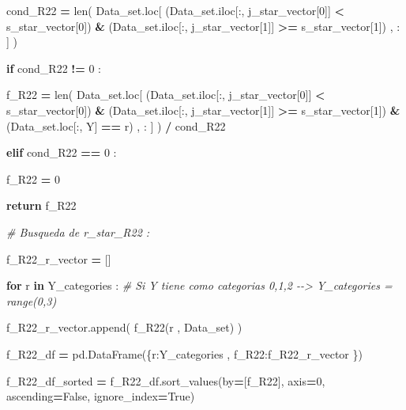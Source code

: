 \documentclass[
  11pt,
  a4paper,
]{article}
\newenvironment{Shaded}{\begin{snugshade}}{\end{snugshade}}
\newcommand{\BuiltInTok}[1]{#1}
\newcommand{\CommentTok}[1]{\textcolor[rgb]{0.56,0.35,0.01}{\textit{#1}}}
\newcommand{\ControlFlowTok}[1]{\textcolor[rgb]{0.13,0.29,0.53}{\textbf{#1}}}
\newcommand{\DecValTok}[1]{\textcolor[rgb]{0.00,0.00,0.81}{#1}}
\newcommand{\KeywordTok}[1]{\textcolor[rgb]{0.13,0.29,0.53}{\textbf{#1}}}
\newcommand{\NormalTok}[1]{#1}
\newcommand{\OperatorTok}[1]{\textcolor[rgb]{0.81,0.36,0.00}{\textbf{#1}}}
\newcommand{\StringTok}[1]{\textcolor[rgb]{0.31,0.60,0.02}{#1}}
\newcommand{\VariableTok}[1]{\textcolor[rgb]{0.00,0.00,0.00}{#1}}
\begin{document}
\begin{Shaded}
\begin{Highlighting}[]
\NormalTok{                    cond\_R22 }\OperatorTok{=} \BuiltInTok{len}\NormalTok{( Data\_set.loc[ (Data\_set.iloc[:, j\_star\_vector[}\DecValTok{0}\NormalTok{]] }\OperatorTok{\textless{}}\NormalTok{ s\_star\_vector[}\DecValTok{0}\NormalTok{]) }\OperatorTok{\&}\NormalTok{ (Data\_set.iloc[:, j\_star\_vector[}\DecValTok{1}\NormalTok{]] }\OperatorTok{\textgreater{}=}\NormalTok{ s\_star\_vector[}\DecValTok{1}\NormalTok{]) , : ] ) }

                    \ControlFlowTok{if}\NormalTok{  cond\_R22 }\OperatorTok{!=} \DecValTok{0}\NormalTok{ :}

\NormalTok{                        f\_R22 }\OperatorTok{=} \BuiltInTok{len}\NormalTok{( Data\_set.loc[ (Data\_set.iloc[:, j\_star\_vector[}\DecValTok{0}\NormalTok{]] }\OperatorTok{\textless{}}\NormalTok{ s\_star\_vector[}\DecValTok{0}\NormalTok{]) }\OperatorTok{\&}\NormalTok{ (Data\_set.iloc[:, j\_star\_vector[}\DecValTok{1}\NormalTok{]] }\OperatorTok{\textgreater{}=}\NormalTok{ s\_star\_vector[}\DecValTok{1}\NormalTok{]) }\OperatorTok{\&}\NormalTok{ (Data\_set.loc[:, }\StringTok{\textquotesingle{}Y\textquotesingle{}}\NormalTok{] }\OperatorTok{==}\NormalTok{ r) , : ] ) }\OperatorTok{/}\NormalTok{ cond\_R22}

            
                    \ControlFlowTok{elif}\NormalTok{ cond\_R22 }\OperatorTok{==} \DecValTok{0}\NormalTok{ :}

\NormalTok{                        f\_R22 }\OperatorTok{=} \DecValTok{0}

            
                    \ControlFlowTok{return}\NormalTok{ f\_R22 }

                
            \CommentTok{\# Busqueda de r\_star\_R22 :}

\NormalTok{                f\_R22\_r\_vector }\OperatorTok{=}\NormalTok{ []}

                \ControlFlowTok{for}\NormalTok{ r }\KeywordTok{in}\NormalTok{ Y\_categories :  }\CommentTok{\# Si Y tiene como categorias 0,1,2 {-}{-}\textgreater{} Y\_categories = range(0,3)}

\NormalTok{                    f\_R22\_r\_vector.append( f\_R22(r , Data\_set) )}

\NormalTok{                f\_R22\_df }\OperatorTok{=}\NormalTok{ pd.DataFrame(\{}\StringTok{\textquotesingle{}r\textquotesingle{}}\NormalTok{:Y\_categories  , }\StringTok{\textquotesingle{}f\_R22\textquotesingle{}}\NormalTok{:f\_R22\_r\_vector \})}
        
\NormalTok{                f\_R22\_df\_sorted }\OperatorTok{=}\NormalTok{ f\_R22\_df.sort\_values(by}\OperatorTok{=}\NormalTok{[}\StringTok{\textquotesingle{}f\_R22\textquotesingle{}}\NormalTok{], axis}\OperatorTok{=}\DecValTok{0}\NormalTok{, ascending}\OperatorTok{=}\VariableTok{False}\NormalTok{, ignore\_index}\OperatorTok{=}\VariableTok{True}\NormalTok{)}


\end{Highlighting}
\end{Shaded}
\end{document}
